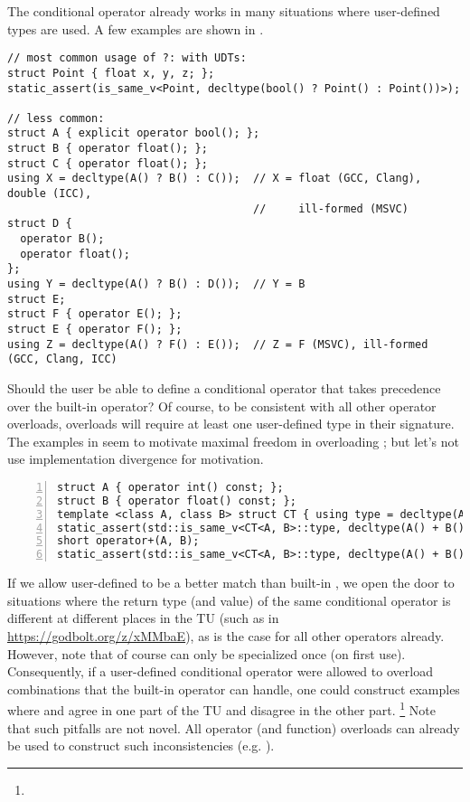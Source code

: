 The conditional operator already works in many situations where user-defined types are used.
A few examples are shown in .
\begin{lstlisting}[style=Vc,float,label=lst:udt-cond-examples,caption={
Examples of the conditional operator with UDTs
}]
// most common usage of ?: with UDTs:
struct Point { float x, y, z; };
static_assert(is_same_v<Point, decltype(bool() ? Point() : Point())>);

// less common:
struct A { explicit operator bool(); };
struct B { operator float(); };
struct C { operator float(); };
using X = decltype(A() ? B() : C());  // X = float (GCC, Clang), double (ICC),
                                      //     ill-formed (MSVC)
struct D {
  operator B();
  operator float();
};
using Y = decltype(A() ? B() : D());  // Y = B
struct E;
struct F { operator E(); };
struct E { operator F(); };
using Z = decltype(A() ? F() : E());  // Z = F (MSVC), ill-formed (GCC, Clang, ICC)
\end{lstlisting}

Should the user be able to define a conditional operator that takes precedence over the built-in operator?
Of course, to be consistent with all other operator overloads,  overloads will require at least one user-defined type in their signature.
The examples in  seem to motivate maximal freedom in overloading ; but let's not use implementation divergence for motivation.

\begin{lstlisting}[style=Vc,numbers=left,float,label=lst:operator+,caption={
  A pitfall of overloading: \code{CT<A, B>} is specialized only on line 4
}]
struct A { operator int() const; };
struct B { operator float() const; };
template <class A, class B> struct CT { using type = decltype(A() + B()); };
static_assert(std::is_same_v<CT<A, B>::type, decltype(A() + B())>);
short operator+(A, B);
static_assert(std::is_same_v<CT<A, B>::type, decltype(A() + B())>);  // fails
\end{lstlisting}

If we allow user-defined  to be a better match than built-in , we open the door to situations where the return type (and value) of the same conditional operator is different at different places in the TU (such as in \url{https://godbolt.org/z/xMMbaE}), as is the case for all other operators already.
However, note that of course  can only be specialized once (on first use).
Consequently, if a user-defined conditional operator were allowed to overload combinations that the built-in operator can handle, one could construct examples where  and  agree in one part of the TU and disagree in the other part.%
\footnote{}
Note that such pitfalls are not novel.
All operator (and function) overloads can already be used to construct such inconsistencies (e.g. ).

